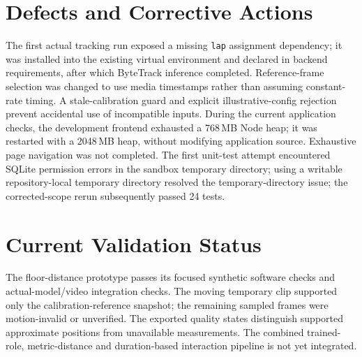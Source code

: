 \section{Defects and Corrective Actions}
The first actual tracking run exposed a missing \texttt{lap} assignment dependency; it was installed into the existing virtual environment and declared in backend requirements, after which ByteTrack inference completed. Reference-frame selection was changed to use media timestamps rather than assuming constant-rate timing. A stale-calibration guard and explicit illustrative-config rejection prevent accidental use of incompatible inputs. During the current application checks, the development frontend exhausted a 768\,MB Node heap; it was restarted with a 2048\,MB heap, without modifying application source. Exhaustive page navigation was not completed. The first unit-test attempt encountered SQLite permission errors in the sandbox temporary directory; using a writable repository-local temporary directory resolved the temporary-directory issue; the corrected-scope rerun subsequently passed 24 tests.

\section{Current Validation Status}
The floor-distance prototype passes its focused synthetic software checks and actual-model/video integration checks. The moving temporary clip supported only the calibration-reference snapshot; the remaining sampled frames were motion-invalid or unverified. The exported quality states distinguish supported approximate positions from unavailable measurements. The combined trained-role, metric-distance and duration-based interaction pipeline is not yet integrated.
